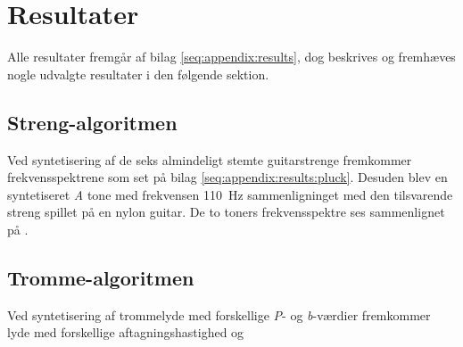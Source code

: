 \section{Resultater}

Alle resultater fremgår af bilag \ref{seq:appendix:results}, dog beskrives og fremhæves nogle udvalgte resultater i den følgende sektion.

\subsection{Streng-algoritmen}

Ved syntetisering af de seks almindeligt stemte guitarstrenge fremkommer frekvensspektrene som set på bilag \ref{seq:appendix:results:pluck}.
Desuden blev en syntetiseret \textit{A} tone med frekvensen \SI{110}{\hertz} sammenligninget med den tilsvarende streng spillet på en nylon guitar.
De to toners frekvensspektre ses sammenlignet på .


\subsection{Tromme-algoritmen}

Ved syntetisering af trommelyde med forskellige \textit{P}- og \textit{b}-værdier fremkommer lyde med forskellige aftagningshastighed og


